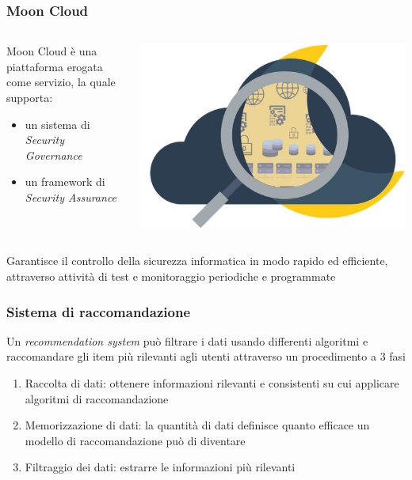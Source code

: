 \begin{frame}
    \frametitle{Moon Cloud}
    \begin{columns}
        \begin{column}{0.55\textwidth}
            Moon Cloud è una piattaforma erogata come servizio, la quale supporta:
            \begin{itemize}
                \item un sistema di \textit{Security Governance}
                \item un framework di \alert{\textit{Security Assurance}}
            \end{itemize}
        \end{column}
        \begin{column}{0.4\textwidth}
            \begin{center}
                \includegraphics[scale=0.12]{images/mc}
            \end{center}
        \end{column}
    \end{columns}
    Garantisce il controllo della sicurezza informatica in modo rapido ed efficiente, attraverso attività di test e monitoraggio 
    periodiche e programmate
\end{frame}

\begin{frame}
    \frametitle{Sistema di raccomandazione}
    Un \textit{recommendation system} può filtrare i dati usando differenti algoritmi e raccomandare gli item più rilevanti agli utenti attraverso 
    un procedimento a 3 fasi
    \begin{enumerate}
        \item \alert{Raccolta di dati}: ottenere informazioni rilevanti e consistenti su cui applicare algoritmi di raccomandazione
        \item \alert{Memorizzazione di dati}: la quantità di dati definisce quanto efficace un modello di raccomandazione può di diventare
        \item \alert{Filtraggio dei dati}: estrarre le informazioni più rilevanti
    \end{enumerate}
\end{frame}

